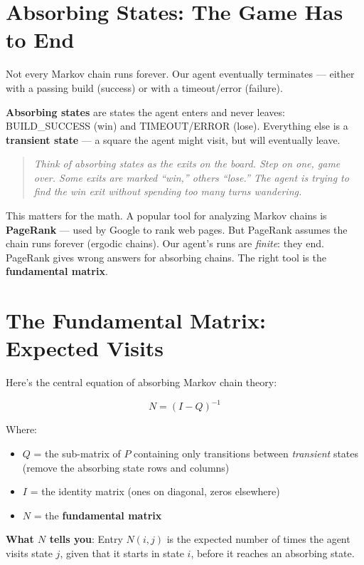 \documentclass[11pt,a4paper]{article}
\begin{document}
\section{Absorbing States: The Game Has to End}

Not every Markov chain runs forever.
Our agent eventually terminates --- either with a passing build (success) or with a timeout/error (failure).

\textbf{Absorbing states} are states the agent enters and never leaves:
BUILD\_SUCCESS (win) and TIMEOUT/ERROR (lose).
Everything else is a \textbf{transient state} --- a square the agent might visit, but will eventually leave.

\begin{quote}
\textit{Think of absorbing states as the exits on the board. Step on one, game over.
Some exits are marked ``win,'' others ``lose.'' The agent is trying to find the win exit
without spending too many turns wandering.}
\end{quote}

This matters for the math.
A popular tool for analyzing Markov chains is \textbf{PageRank} ---
used by Google to rank web pages.
But PageRank assumes the chain runs forever (ergodic chains).
Our agent's runs are \emph{finite}: they end.
PageRank gives wrong answers for absorbing chains.
The right tool is the \textbf{fundamental matrix}.

\section{The Fundamental Matrix: Expected Visits}

Here's the central equation of absorbing Markov chain theory:

\[
N = (I - Q)^{-1}
\]

Where:
\begin{itemize}
  \item $Q$ = the sub-matrix of $P$ containing only transitions between \emph{transient} states
    (remove the absorbing state rows and columns)
  \item $I$ = the identity matrix (ones on diagonal, zeros elsewhere)
  \item $N$ = the \textbf{fundamental matrix}
\end{itemize}

\textbf{What $N$ tells you}: Entry $N(i,j)$ is the expected number of times
the agent visits state $j$, given that it starts in state $i$, before it reaches an absorbing state.
\end{document}
